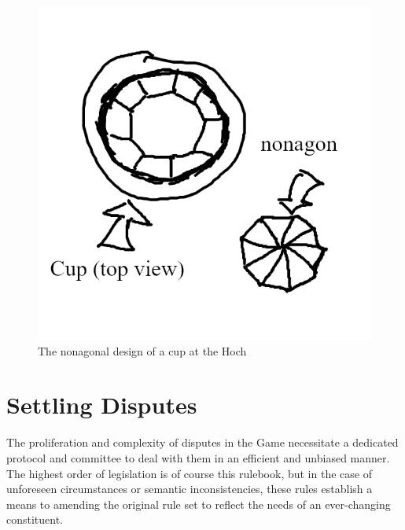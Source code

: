\documentclass[12pt]{IEEEconf}
\begin{document}
\begin{enumerate}
\begin{figure}
\begin{center}
                \includegraphics[width=0.7\linewidth]{fig/cup.png}
                \caption{The nonagonal design of a cup at the Hoch}
                \label{fig:cup}
            \end{center}
          \end{figure}
\end{enumerate}
\section{Settling Disputes}
The proliferation and complexity of disputes in the Game necessitate a dedicated protocol and committee to deal with them in an efficient and unbiased manner. The highest order of legislation is of course this rulebook, but in the case of unforeseen circumstances or semantic inconsistencies, these rules establish a means to amending the original rule set to reflect the needs of an ever-changing constituent.
\end{document}
